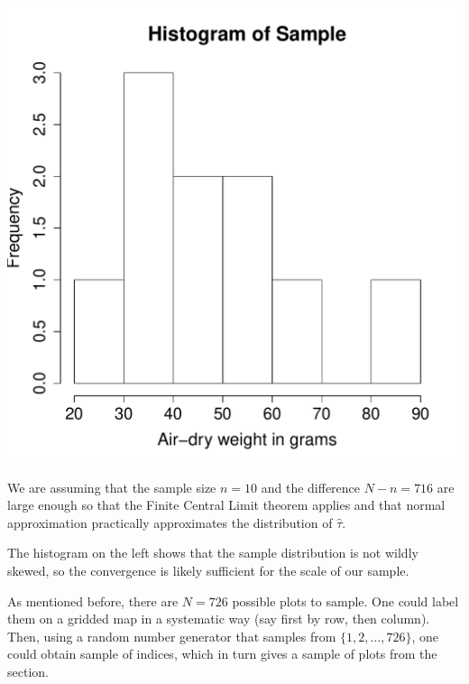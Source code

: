 \documentclass{homework}
\begin{document}
\begin{solution}
\begin{minipage}{.49\textwidth}
  \includegraphics[width=\textwidth]{wgt_sample.pdf}
\end{minipage}
\begin{minipage}{.49\textwidth}
  We are assuming that the sample size $n=10$ and the difference $N-n = 716$ are large enough so that the Finite Central Limit theorem applies and that normal approximation practically approximates the distribution of $\hat \tau$.

  The histogram on the left shows that the sample distribution is not wildly skewed, so the convergence is likely sufficient for the scale of our sample.
\end{minipage}

\end{solution}


\begin{solution}
  As mentioned before, there are $N=726$ possible plots to sample. One could label them on a gridded map in a systematic way (say first by row, then column).  Then, using a random number generator that samples from $\{1,2,\dots,726\}$, one could obtain sample of indices, which in turn gives a sample of plots from the section.
\end{solution}
\end{document}
